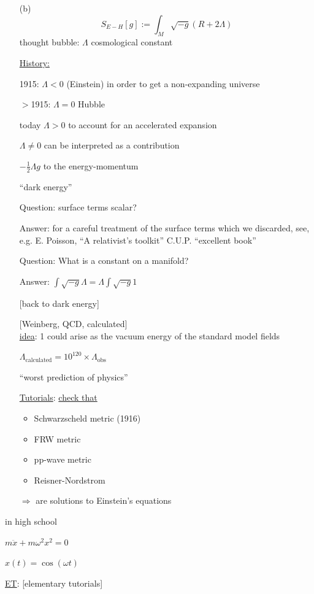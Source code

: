 \documentclass[10pt]{amsart}
\begin{document}
\begin{multicols*}{2}
\begin{enumerate}
		\item[(b)] \[
		S_{E-H}[g] := \int_M \sqrt{-g} (R+ 2\Lambda)
		\]
		thought bubble: $\Lambda$ cosmological constant
		
		\underline{History:}
		
		1915: $\Lambda < 0$ (Einstein) in order to get a non-expanding universe
		
		$>$1915: $\Lambda =0$ Hubble 
		
		today $\Lambda > 0$ to account for an accelerated expansion
		
		$\Lambda \neq 0$ can be interpreted as a contribution
		
		$-\frac{1}{2} \Lambda g$ to the energy-momentum 
		
		``dark energy''
		
		Question: surface terms scalar?
		
		Answer: for a careful treatment of the surface terms which we discarded, see, e.g. E. Poisson, ``A relativist's toolkit'' C.U.P. ``excellent book''
		
		Question: What is a constant on a manifold?
		
		Answer: $\int \sqrt{-g} \Lambda = \Lambda \int \sqrt{-g} 1$
		
		[back to dark energy]
		
		[Weinberg, QCD, calculated] \\
		\underline{idea}: 1 could arise as the vacuum energy of the standard model fields 
		
		$\Lambda_{\text{calculated}} = 10^{120} \times \Lambda_{\text{obs}}$
		
		``worst prediction of physics''
		
		\underline{Tutorials}: \underline{check that }
		\begin{itemize}
			\item Schwarzscheld metric (1916)
			\item FRW metric 
			\item pp-wave metric 
			\item Reisner-Nordstrom 
		\end{itemize}
		$\Longrightarrow $ are solutions to Einstein's equations
	\end{enumerate}
	
	in high school 
	
	$m\ddot{x} + m\omega^2 x^2=0$
	
	$x(t) = \cos{(\omega t)}$
	
	\underline{ET}: [elementary tutorials]
	

\end{multicols*}
\end{document}
